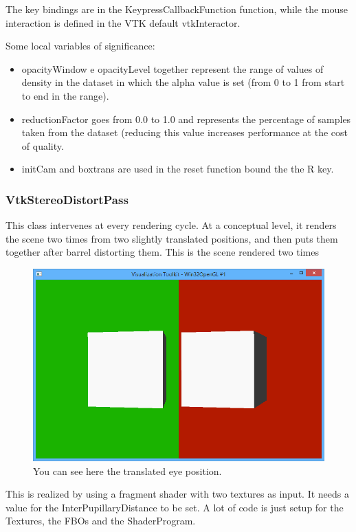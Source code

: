 \documentclass[11pt]{article} %
\begin{document}
The key bindings are in the KeypressCallbackFunction function, while the mouse interaction is defined in the VTK default  vtkInteractor.

Some local variables of significance:
\begin{itemize}
\item opacityWindow e opacityLevel together represent the range of values of density in the dataset in which the alpha value is set (from 0 to 1 from start to end in the range).
\item reductionFactor goes from 0.0 to 1.0 and represents the percentage of samples taken from the dataset (reducing this value increases performance at the cost of quality.
\item initCam and boxtrans are used in the reset function bound the the R key.
\end{itemize}

%
\FloatBarrier
\pagebreak
\subsubsection{VtkStereoDistortPass}
This class intervenes at every rendering cycle. At a conceptual level, it renders the scene two times from two slightly translated positions, and then puts them together after barrel distorting them.
This is the scene rendered two times
\begin{figure}[h!]

\includegraphics[width=0.8\linewidth]{img/stereodistortpass_eyedistance.PNG}
  \caption{You can see here the translated eye position.}

\end{figure}


This is realized by using a fragment shader with two textures as input. It needs a value for the InterPupillaryDistance to be set. A lot of code is just setup for the Textures, the FBOs and the ShaderProgram.
\end{document}

